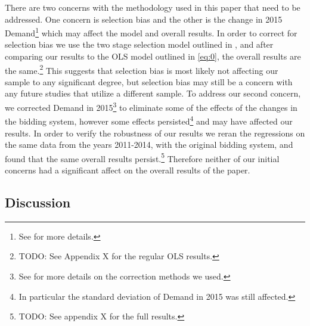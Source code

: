 There are two concerns with the methodology used in this paper that need to be addressed.
One concern is selection bias and the other is the change in 2015 Demand\footnote{See  for more details.} which may affect the model and overall results.
In order to correct for selection bias we use the two stage selection model outlined in , and after comparing our results to the OLS model outlined in \eqref{eq:0}, the overall results are the same.\footnote{TODO: See Appendix X for the regular OLS results.} 
This suggests that selection bias is most likely not affecting our sample to any significant degree, but selection bias may still be a concern with any future studies that utilize a different sample.
To address our second concern, we corrected Demand in 2015\footnote{See  for more details on the correction methods we used.} to eliminate some of the effects of the changes in the bidding system, however some effects persisted\footnote{In particular the standard deviation of Demand in 2015 was still affected.} and may have affected our results.
In order to verify the robustness of our results we reran the regressions on the same data from the years 2011-2014, with the original bidding system, and found that the same overall results persist.\footnote{TODO: See appendix X for the full results.}
Therefore neither of our initial concerns had a significant affect on the overall results of the paper.

\subsection{Discussion}\label{results:discussion}

